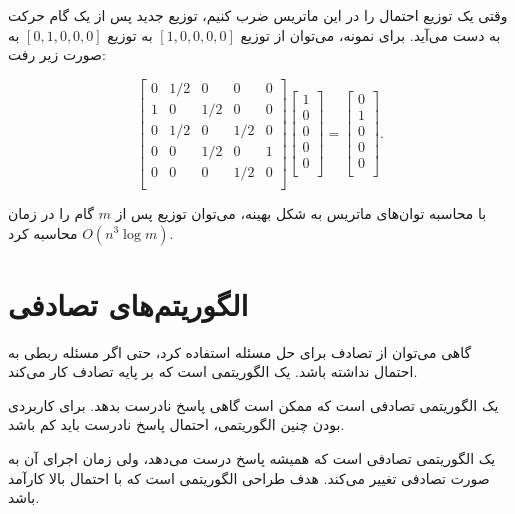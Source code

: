 وقتی یک توزیع احتمال را در این ماتریس ضرب کنیم،
توزیع جدید پس از یک گام حرکت به دست می‌آید.
برای نمونه، می‌توان از توزیع
$[1,0,0,0,0]$ به توزیع
$[0,1,0,0,0]$ به صورت زیر رفت:

\[ 
 \begin{bmatrix}
  0 & 1/2 & 0 & 0 & 0 \\
  1 & 0 & 1/2 & 0 & 0 \\
  0 & 1/2 & 0 & 1/2 & 0 \\
  0 & 0 & 1/2 & 0 & 1 \\
  0 & 0 & 0 & 1/2 & 0 \\
 \end{bmatrix}
 \begin{bmatrix}
  1 \\
  0 \\
  0 \\
  0 \\
  0 \\
 \end{bmatrix}
=
 \begin{bmatrix}
  0 \\
  1 \\
  0 \\
  0 \\
  0 \\
 \end{bmatrix}.
\]

با محاسبه توان‌های ماتریس به شکل بهینه،
می‌توان توزیع پس از $m$ گام را
در زمان $O(n^3 \log m)$ محاسبه کرد.

\section{الگوریتم‌های تصادفی}


گاهی می‌توان از تصادف برای حل مسئله استفاده کرد،
حتی اگر مسئله ربطی به احتمال نداشته باشد.
یک  الگوریتمی است که
بر پایه تصادف کار می‌کند.


یک  الگوریتمی تصادفی است
که ممکن است گاهی پاسخ نادرست بدهد.
برای کاربردی بودن چنین الگوریتمی،
احتمال پاسخ نادرست باید کم باشد.


یک  الگوریتمی تصادفی است
که همیشه پاسخ درست می‌دهد،
ولی زمان اجرای آن به صورت تصادفی تغییر می‌کند.
هدف طراحی الگوریتمی است که
با احتمال بالا کارآمد باشد.

